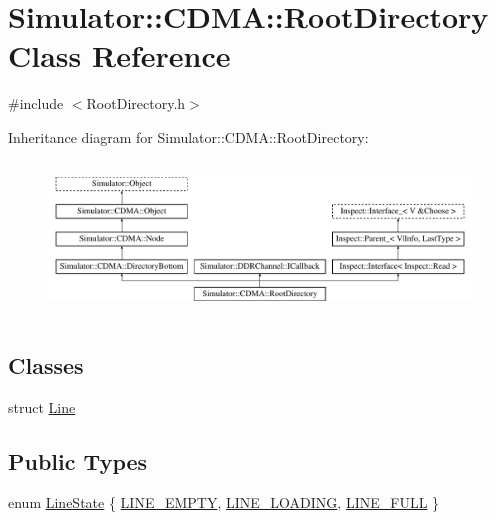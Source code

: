 \hypertarget{class_simulator_1_1_c_d_m_a_1_1_root_directory}{\section{Simulator\+:\+:C\+D\+M\+A\+:\+:Root\+Directory Class Reference}
\label{class_simulator_1_1_c_d_m_a_1_1_root_directory}
}


{\ttfamily \#include $<$Root\+Directory.\+h$>$}

Inheritance diagram for Simulator\+:\+:C\+D\+M\+A\+:\+:Root\+Directory\+:\begin{figure}[H]
\begin{center}
\leavevmode
\includegraphics[height=4.111601cm]{class_simulator_1_1_c_d_m_a_1_1_root_directory}
\end{center}
\end{figure}
\subsection*{Classes}
\begin{DoxyCompactItemize}
\item 
struct \hyperlink{struct_simulator_1_1_c_d_m_a_1_1_root_directory_1_1_line}{Line}
\end{DoxyCompactItemize}
\subsection*{Public Types}
\begin{DoxyCompactItemize}
\item 
enum \hyperlink{class_simulator_1_1_c_d_m_a_1_1_root_directory_a54079b84b63737f0a28b9a28dbd5f1ee}{Line\+State} \{ \hyperlink{class_simulator_1_1_c_d_m_a_1_1_root_directory_a54079b84b63737f0a28b9a28dbd5f1eea6f76a2a737d4dad0557095188c84901a}{L\+I\+N\+E\+\_\+\+E\+M\+P\+T\+Y}, 
\hyperlink{class_simulator_1_1_c_d_m_a_1_1_root_directory_a54079b84b63737f0a28b9a28dbd5f1eea047b0bc37b08f6d1139983bfbb1b7e53}{L\+I\+N\+E\+\_\+\+L\+O\+A\+D\+I\+N\+G}, 
\hyperlink{class_simulator_1_1_c_d_m_a_1_1_root_directory_a54079b84b63737f0a28b9a28dbd5f1eeaf8cbde22d20259276a0bea66bfc54db7}{L\+I\+N\+E\+\_\+\+F\+U\+L\+L}
 \}
\end{DoxyCompactItemize}
